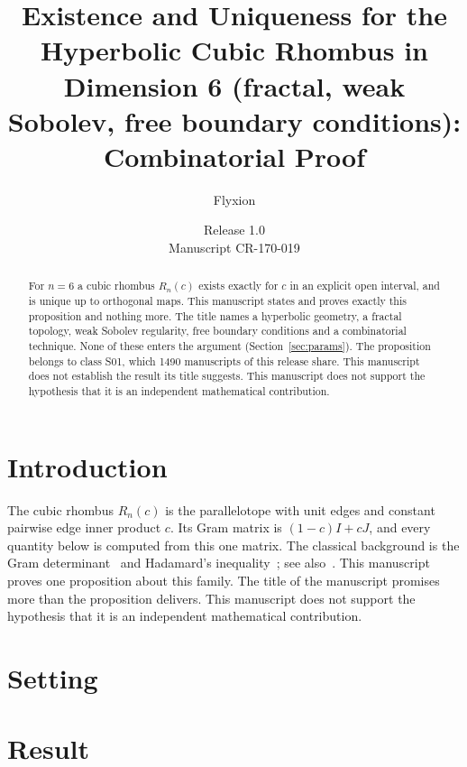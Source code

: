 \documentclass[11pt]{article}
\title{Existence and Uniqueness for the Hyperbolic Cubic Rhombus in Dimension 6 (fractal, weak Sobolev, free boundary conditions): Combinatorial Proof}
\author{Flyxion}
\date{Release 1.0\\ Manuscript CR-170-019}
\begin{document}
\maketitle
\begin{abstract}
For $n=6$ a cubic rhombus $R_n(c)$ exists exactly for $c$ in an explicit open interval, and is unique up to orthogonal maps. This manuscript states and proves exactly this proposition and nothing more. The title names a hyperbolic geometry, a fractal topology, weak Sobolev regularity, free boundary conditions and a combinatorial technique. None of these enters the argument (Section~\ref{sec:params}). The proposition belongs to class S01, which 1490 manuscripts of this release share. This manuscript does not establish the result its title suggests. This manuscript does not support the hypothesis that it is an independent mathematical contribution.
\end{abstract}

\section{Introduction}
The cubic rhombus $R_n(c)$ is the parallelotope with unit edges and constant pairwise edge inner product $c$. Its Gram matrix is $(1-c)I+cJ$, and every quantity below is computed from this one matrix. The classical background is the Gram determinant~\cite{gram} and Hadamard's inequality~\cite{hadamard}; see also~\cite{hj}.
This manuscript proves one proposition about this family. The title of the manuscript promises more than the proposition delivers. This manuscript does not support the hypothesis that it is an independent mathematical contribution.

\section{Setting}


\section{Result}

\end{document}
